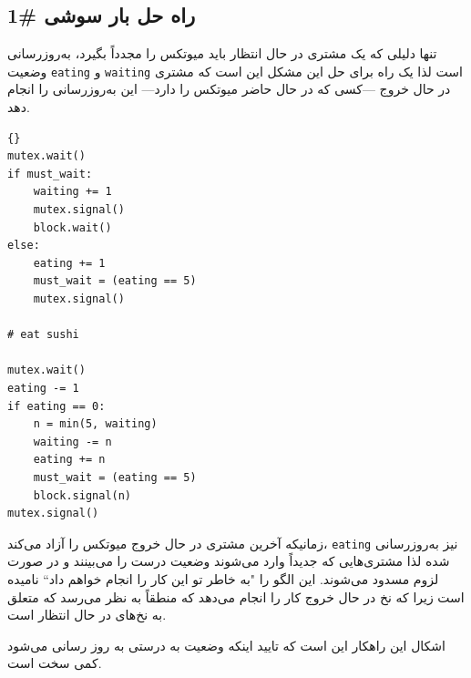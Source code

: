 \documentclass{book}
\newcommand{\clearemptydoublepage}{\newpage\cleardoublepage}
\begin{document}
\clearemptydoublepage
\subsection{راه حل بار سوشی  \#1}

    تنها دلیلی که یک مشتری در حال انتظار باید میوتکس را مجدداً بگیرد، به‌روزرسانی وضعیت  {\tt eating} و {\tt waiting} است لذا 
    یک راه برای حل این مشکل این است که مشتری  در حال خروج ---کسی که در حال حاضر میوتکس را دارد--- این به‌روزرسانی را انجام دهد. 

\begin{latin}
\begin{lstlisting}[title=\rl{راه حل بار سوشی  \#1}]{}
mutex.wait()
if must_wait:
    waiting += 1
    mutex.signal()
    block.wait()
else:
    eating += 1
    must_wait = (eating == 5)
    mutex.signal()

# eat sushi

mutex.wait()
eating -= 1
if eating == 0:
    n = min(5, waiting)
    waiting -= n
    eating += n
    must_wait = (eating == 5)
    block.signal(n)
mutex.signal()
\end{lstlisting}
\end{latin}

    زمانیکه آخرین مشتری در حال خروج میوتکس را آزاد می‌کند، {\tt eating} نیز به‌روزرسانی شده لذا مشتری‌هایی که جدیداً وارد می‌شوند وضعیت درست 
    را می‌بینند و در صورت لزوم مسدود می‌شوند.  این الگو را ‍‍"به خاطر تو این کار را انجام خواهم داد`` نامیده است زیرا که نخ در حال خروج 
    کار را انجام می‌دهد که منطقاً به نظر می‌رسد که متعلق به نخ‌های در حال انتظار است. 

    اشکال این راهکار این است که تایید اینکه وضعیت به درستی به روز رسانی می‌شود کمی سخت است. 
\end{document}

